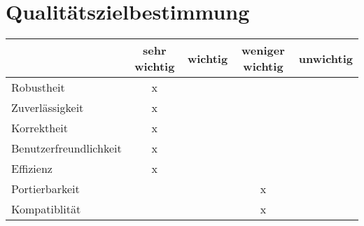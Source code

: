 \section{Qualitätszielbestimmung}

\begin{tabular}{l || c | c | c | c}
 & sehr wichtig & wichtig & weniger wichtig & unwichtig \\ \hline \hline
Robustheit 				& x &   &   &   \\ \hline
Zuverlässigkeit 		& x &   &   &   \\ \hline
Korrektheit				& x &   &   &   \\ \hline
Benutzerfreundlichkeit	& x &   &   &   \\ \hline
Effizienz				& x &   &   &   \\ \hline
Portierbarkeit			&   &   & x &   \\ \hline
Kompatiblität			&   &   & x &   \\ \hline
\end{tabular}